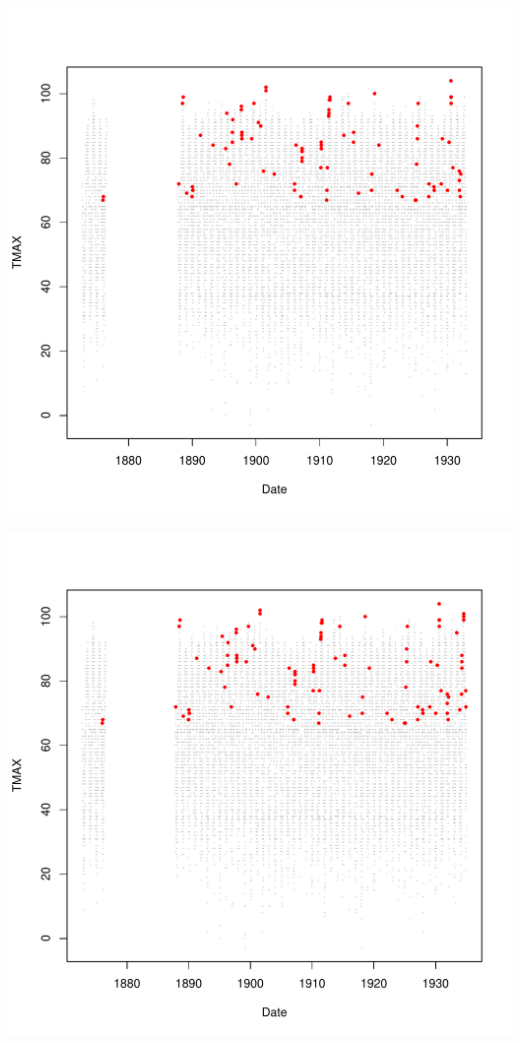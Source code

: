 \documentclass{article}\usepackage[]{graphicx}\usepackage[]{color}
\makeatletter
\def\maxwidth{ %
  \ifdim\Gin@nat@width>\linewidth
    \linewidth
  \else
    \Gin@nat@width
  \fi
}
\newenvironment{knitrout}{}{} %
\makeatother
\begin{document}
\begin{knitrout}
\includegraphics[width=\maxwidth]{figure/unnamed-chunk-4-26} 

\includegraphics[width=\maxwidth]{figure/unnamed-chunk-4-27} 


\end{knitrout}
\end{document}
